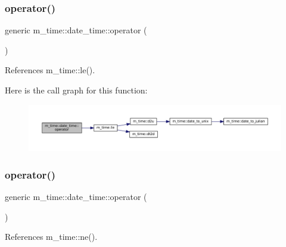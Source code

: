 \subsubsection{\texorpdfstring{operator()}{operator()}\hspace{0.1cm}{\footnotesize\ttfamily [6/9]}}
{\footnotesize\ttfamily generic m\+\_\+time\+::date\+\_\+time\+::operator (\begin{DoxyParamCaption}{ }\end{DoxyParamCaption})\hspace{0.3cm}{\ttfamily [private]}}



References m\+\_\+time\+::le().

Here is the call graph for this function\+:\nopagebreak
\begin{figure}[H]
\begin{center}
\leavevmode
\includegraphics[width=350pt]{structm__time_1_1date__time_add9b1c423294accdf967e22fa61a7796_cgraph}
\end{center}
\end{figure}
\mbox{\label{structm__time_1_1date__time_af93a94ed420ca7ba08cc63c36e88459c}} 
\subsubsection{\texorpdfstring{operator()}{operator()}\hspace{0.1cm}{\footnotesize\ttfamily [7/9]}}
{\footnotesize\ttfamily generic m\+\_\+time\+::date\+\_\+time\+::operator (\begin{DoxyParamCaption}{ }\end{DoxyParamCaption})\hspace{0.3cm}{\ttfamily [private]}}



References m\+\_\+time\+::ne().

